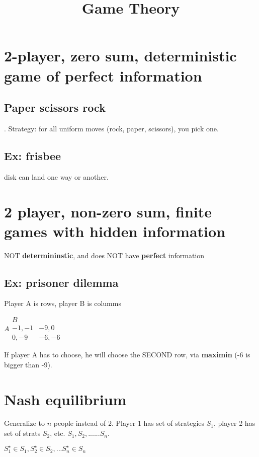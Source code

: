 \documentclass[12pt]{article}
\begin{document}

\title{Game Theory}

\section{2-player, zero sum, deterministic game of perfect information}

\subsection{Paper scissors rock}. Strategy: for all uniform moves (rock, paper, scissors), you pick one. 

\subsection{Ex: frisbee}
disk can land one way or another. 

\section{2 player, non-zero sum, finite games with hidden information}

NOT \textbf{determininstic}, and does NOT have \textbf{perfect} information


\subsection{Ex: prisoner dilemma}
Player A is rows, player B is columms

$
A  
\begin{array}{|c|c}
	B \\
    \hline
  -1,-1 & -9,0\\
  \hline
  0,-9 & -6,-6
\end{array}
$

If player A has to choose, he will choose the SECOND row, via \textbf{maximin} (-6 is bigger than -9). 
 
\section{Nash equilibrium}
Generalize to $n$ people instead of 2. 
Player 1 has set of strategies $S_1$, player 2 has set of strats $S_2$, etc. 
$S_1, S_2, ......S_n$.

$S_1^{\star} \in S_1, S_2^{\star} \in S_2, ... S_n^{\star} \in S_n$
\end{document}
